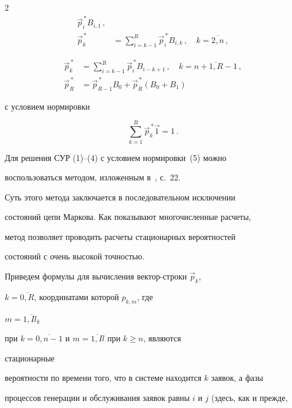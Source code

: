\begin{multicols}{2}
\begin{align}
\vec p_i^{\,*} B_{i,1}\,,\\


\vec p_k^{\,*} &= \sum\limits_{i=k-1}^{R} \vec p_i^{\,*} B_{i,k}\,, \quad 


k=\overline{2,n}\,,


\end{align}


\begin{align}


\vec p_k^{\,*} & = \sum\limits_{i=k-1}^{R} \vec p_i^{\,*} B_{i-k+1}\,, \quad 


k=\overline{n+1,R-1}\,,\\


\vec p_{R}^{\,*} & = \vec p_{R-1}^{\,*} B_0 + \vec p_{R}^{\,*} (B_0+B_1)


\end{align}


с условием нормировки


\begin{equation}


\sum\limits_{k=1}^{R} \vec p^{\,*}_k \vec1 = 1\,.


\end{equation}





Для решения СУР (1)--(4) с условием нормировки~(5) можно


воспользоваться методом, изложенным в~\cite{BDPS04}, с.~22.


Суть этого метода заключается в последовательном исключении


состояний цепи Маркова. Как показывают многочисленные расчеты,


метод позволяет проводить расчеты стационарных вероятностей


состояний с очень высокой точностью.





Приведем формулы для вычисления вектор-строки $\vec p_k$,


$k=\overline{0,R}$, координатами которой $p_{k,m}$, где


$m=\overline{1,Il_k}$


при $k=\overline{0,n-1}$ и $m=\overline{1,Il}$ при $k\geq n$, являются


стационарные


вероятности по времени того, что в системе находится $k$ заявок, а фазы


процессов генерации и обслуживания заявок равны $i$ и $j$ (здесь, как и прежде,



\end{multicols}
